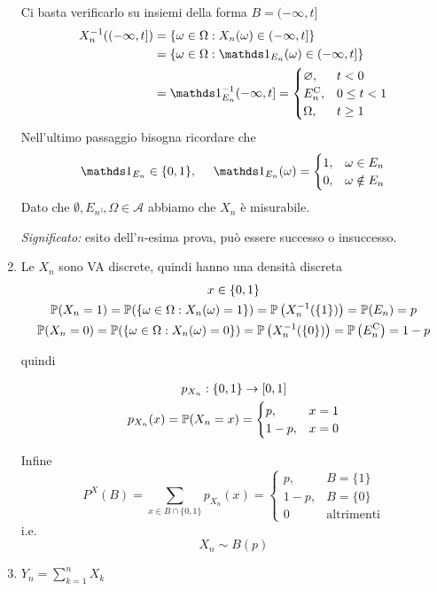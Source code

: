 \begin{enumerate}
Ci basta verificarlo su insiemi della forma $B=( -\infty ,t]$
\begin{align*}
X_{n}^{-1}(( -\infty ,t]) & =\{\omega \in \Omega :X_{n}( \omega ) \in ( -\infty ,t]\}\\
 & =\{\omega \in \Omega :\Ind_{E_{n}}( \omega ) \in ( -\infty ,t]\}\\
 & =\Ind_{E_{n}}^{-1}( -\infty ,t] =
\begin{cases}
\emptyset , & t< 0\\
E_{n}\comp , & 0\leq t< 1\\
\Omega , & t\geq 1
\end{cases}
\end{align*}
Nell'ultimo passaggio bisogna ricordare che
\begin{equation*}
\Ind_{E_{n}} \in \{0,1\} ,\ \ \ \ \Ind_{E_{n}}( \omega ) =
\begin{cases}
1, & \omega \in E_{n}\\
0, & \omega \notin E_{n}
\end{cases}
\end{equation*}
Dato che $\emptyset ,E_{n}\comp ,\Omega \in \mathcal{A}$ abbiamo che $X_{n}$ è misurabile.

\textit{Significato:} esito dell'$n$-esima prova, può essere successo o insuccesso.
\item Le $X_{n}$ sono VA discrete, quindi hanno una densità discreta
\begin{gather*}
x\in \{0,1\}\\
\mathbb{P}( X_{n} =1) =\mathbb{P}(\{\omega \in \Omega :X_{n}( \omega ) =1\}) =\mathbb{P}\left( X_{n}^{-1}(\{1\})\right) =\mathbb{P}( E_{n}) =p\\
\mathbb{P}( X_{n} =0) =\mathbb{P}(\{\omega \in \Omega :X_{n}( \omega ) =0\}) =\mathbb{P}\left( X_{n}^{-1}(\{0\})\right) =\mathbb{P}\left( E_{n}^{\mathrm{C}}\right) =1-p
\end{gather*}

quindi

\begin{gather*}
p_{X_{n}} :\{0,1\}\rightarrow [ 0,1]\\
p_{X_{n}}( x) =\mathbb{P}( X_{n} =x) =
\begin{cases}
p, & x=1\\
1-p, & x=0
\end{cases}
\end{gather*}

Infine
\begin{equation*}
P^{X}( B) =\sum\limits _{x\in B\cap \{0,1\}} p_{X_{n}}( x) =
\begin{cases}
p, & B=\{1\}\\
1-p, & B=\{0\}\\
0 & \text{altrimenti}
\end{cases}
\end{equation*}
i.e.
\begin{equation*}
\boxed{X_{n} \sim B( p)}
\end{equation*}
\item $Y_{n} =\sum\limits _{k=1}^{n} X_{k}$


\end{enumerate}

